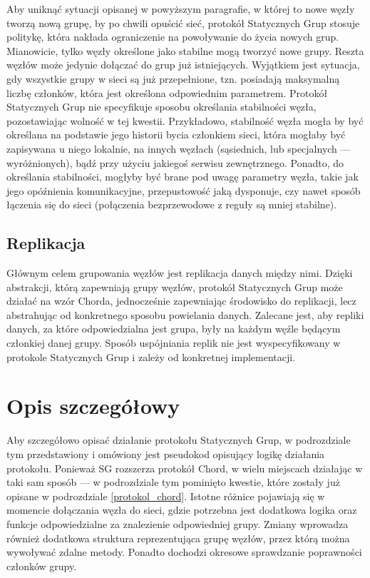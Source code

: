 \documentclass[12pt, twoside, openany]{report}
\begin{document}
Aby uniknąć sytuacji opisanej w powyższym paragrafie, w której to nowe węzły tworzą nową grupę, by po chwili opuścić sieć, protokół Statycznych Grup stosuje politykę, która nakłada ograniczenie na powoływanie do życia nowych grup. Mianowicie, tylko węzły określone jako stabilne mogą tworzyć nowe grupy. Reszta węzłów może jedynie dołączać do grup już istniejących. Wyjątkiem jest sytuacja, gdy wszystkie grupy w sieci są już przepełnione, tzn. posiadają maksymalną liczbę członków, która jest określona odpowiednim parametrem. Protokół Statycznych Grup nie specyfikuje sposobu określania stabilności węzła, pozostawiając wolność w tej kwestii. Przykładowo, stabilność węzła mogła by być określana na podstawie jego historii bycia członkiem sieci, która mogłaby być zapisywana u niego lokalnie, na innych węzłach (sąsiednich, lub specjalnych --- wyróżnionych), bądź przy użyciu jakiegoś serwisu zewnętrznego. Ponadto, do określania stabilności, mogłyby być brane pod uwagę parametry węzła, takie jak jego opóźnienia komunikacyjne, przepustowość jaką dysponuje, czy nawet sposób łączenia się do sieci (połączenia bezprzewodowe z reguły są mniej stabilne).

\subsection{Replikacja}
Głównym celem grupowania węzłów jest replikacja danych między nimi. Dzięki abstrakcji, którą zapewniają grupy węzłów, protokół Statycznych Grup może działać na wzór Chorda, jednocześnie zapewniając środowisko do replikacji, lecz abstrahując od konkretnego sposobu powielania danych. Zalecane jest, aby repliki danych, za które odpowiedzialna jest grupa, były na każdym węźle będącym członkiej danej grupy. Sposób uspójniania replik nie jest wyspecyfikowany w protokole Statycznych Grup i zależy od konkretnej implementacji.

\section{Opis szczegółowy}

Aby szczegółowo opisać działanie protokołu Statycznych Grup, w podrozdziale tym przedstawiony i omówiony jest pseudokod opisujący logikę działania protokołu. Ponieważ SG rozszerza protokół Chord, w wielu miejscach działając w taki sam sposób --- w podrozdziale tym pominięto kwestie, które zostały już opisane w podrozdziale \ref{protokol_chord}. Istotne różnice pojawiają się w momencie dołączania węzła do sieci, gdzie potrzebna jest dodatkowa logika oraz funkcje odpowiedzialne za znalezienie odpowiedniej grupy. Zmiany wprowadza również dodatkowa struktura reprezentująca grupę węzłów, przez którą można wywoływać zdalne metody. Ponadto dochodzi okresowe sprawdzanie poprawności członków grupy.
\end{document}
